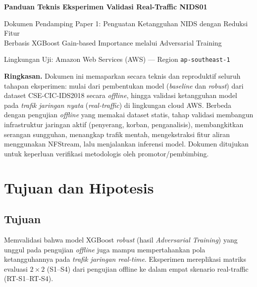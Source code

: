 \documentclass[11pt, a4paper]{article}
\begin{document}
\begin{center}
    {\Large \bfseries Panduan Teknis Eksperimen Validasi Real-Traffic NIDS01\par}
    \vspace{0.2cm}
    {\normalsize Dokumen Pendamping Paper 1: Penguatan Ketangguhan NIDS dengan Reduksi Fitur \\ Berbasis XGBoost Gain-based Importance melalui Adversarial Training \par}
    \vspace{0.15cm}
    {\small Lingkungan Uji: Amazon Web Services (AWS) --- Region \texttt{ap-southeast-1} \par}
\end{center}

\vspace{0.3cm}

\noindent\textbf{Ringkasan.} Dokumen ini memaparkan secara teknis dan reproduktif seluruh tahapan eksperimen: mulai dari pembentukan model (\textit{baseline} dan \textit{robust}) dari dataset CSE-CIC-IDS2018 secara \textit{offline}, hingga validasi ketangguhan model pada \textit{trafik jaringan nyata} (\textit{real-traffic}) di lingkungan cloud AWS. Berbeda dengan pengujian \textit{offline} yang memakai dataset statis, tahap validasi membangun infrastruktur jaringan aktif (penyerang, korban, penganalisis), membangkitkan serangan sungguhan, menangkap trafik mentah, mengekstraksi fitur aliran menggunakan NFStream, lalu menjalankan inferensi model. Dokumen ditujukan untuk keperluan verifikasi metodologis oleh promotor/pembimbing.

\tableofcontents

\vspace{0.3cm}

\section{Tujuan dan Hipotesis}

\subsection{Tujuan}
Memvalidasi bahwa model XGBoost \textit{robust} (hasil \textit{Adversarial Training}) yang unggul pada pengujian \textit{offline} juga mampu mempertahankan pola ketangguhannya pada \textit{trafik jaringan real-time}. Eksperimen mereplikasi matriks evaluasi $2\times 2$ (S1--S4) dari pengujian offline ke dalam empat skenario real-traffic (RT-S1--RT-S4).
\end{document}
